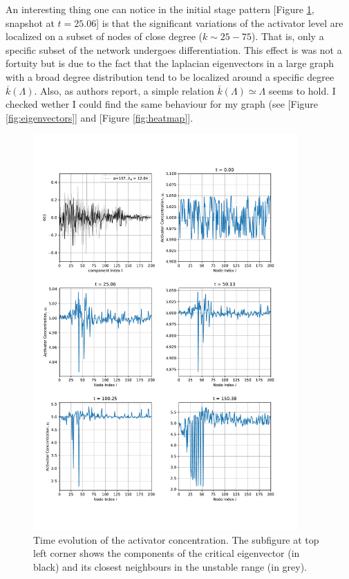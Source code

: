 An interesting thing one can notice in the initial stage pattern [Figure \ref{fig:snapshots}, snapshot at $t = 25.06$] is that the significant variations of the activator level are localized on a subset of nodes of close degree ($k \sim 25-75$). That is, only a specific subset of the network undergoes differentiation. This effect is was not a fortuity but is due to the fact that the laplacian eigenvectors in a large graph with a broad degree distribution tend to be localized around a specific degree $\overline{k}(\Lambda)$. Also, as authors report, a simple relation $\overline{k}(\Lambda) \simeq \Lambda$ seems to hold. I checked wether I could find the same behaviour for my graph (see [Figure \ref{fig:eigenvectors}] and [Figure \ref{fig:heatmap}].
\begin{figure}[H]
    \centering
    \includegraphics[width = 0.9\textwidth]{latex_source/images/turing/snapshots.pdf}
    \caption{Time evolution of the activator concentration. The subfigure at top left corner shows the components of the critical eigenvector (in black) and its closest neighbours in the unstable range (in grey).}
    \label{fig:snapshots}
\end{figure}
